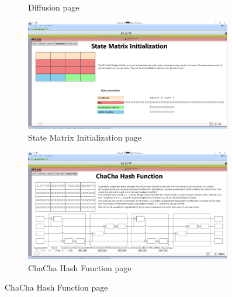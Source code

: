 \begin{figure}
\begin{subfigure}{.5\textwidth}
  \caption{Diffusion page}
\end{subfigure}%
\begin{subfigure}{.5\textwidth}
  \centering
  \includegraphics[width=0.99\textwidth]{figures/ct2/all-pages/4-statematrix.png}
  \caption{State Matrix Initialization page}
\end{subfigure}
\begin{subfigure}{.5\textwidth}
  \centering
  \includegraphics[width=0.99\textwidth]{figures/ct2/all-pages/5-chachahash.png}
  \caption{ChaCha Hash Function page}
\end{subfigure}
\end{figure}

